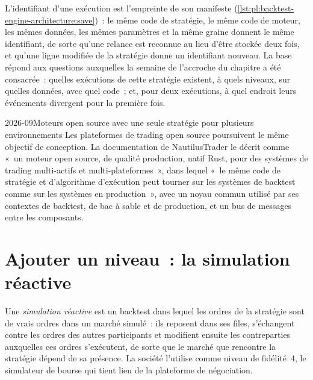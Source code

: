 L'identifiant d'une exécution est l'empreinte de son manifeste (\cref{lst:pl:backtest-engine-architecture:save})~: le même code de stratégie, le même code de moteur,
les mêmes données, les mêmes paramètres et la même graine donnent le même identifiant, de sorte qu'une relance est reconnue au lieu d'être stockée deux fois,
et qu'une ligne modifiée de la stratégie donne un identifiant nouveau. La base répond aux questions auxquelles la semaine de l'accroche du chapitre a été consacrée~: quelles exécutions de cette stratégie existent,
à quels niveaux, sur quelles données, avec quel code~; et, pour deux exécutions, à quel endroit leurs événements divergent pour la première fois.

\label{lst:pl:backtest-engine-architecture:save}

\begin{dated}{2026-09}{Moteurs open source avec une seule stratégie pour plusieurs environnements}\label{dat:pl:backtest-engine-architecture:oss}
Les plateformes de trading open source poursuivent le même objectif de conception. La documentation de NautilusTrader le décrit comme «~un moteur open source, de qualité production, natif Rust,
pour des systèmes de trading multi-actifs et multi-plateformes~», dans lequel «~le même code de stratégie et d'algorithme d'exécution peut
tourner sur les systèmes de backtest comme sur les systèmes en production~», avec un noyau commun utilisé par ses contextes de backtest, de bac à sable et de production, et un bus de messages
entre les composants.
\end{dated}

\section{Ajouter un niveau~: la simulation réactive}

\begin{definition}\label{def:pl:backtest-engine-architecture:reactive}
Une \emph{simulation réactive} est un backtest dans lequel les ordres de la stratégie sont de vrais ordres dans un
marché simulé~: ils reposent dans ses files, s'échangent contre les ordres des autres participants et modifient ensuite les contreparties auxquelles ces ordres s'exécutent,
de sorte que le marché que rencontre la stratégie dépend de sa présence. La société l'utilise comme niveau de fidélité~4, le simulateur de bourse
qui tient lieu de la plateforme de négociation.
\end{definition}

